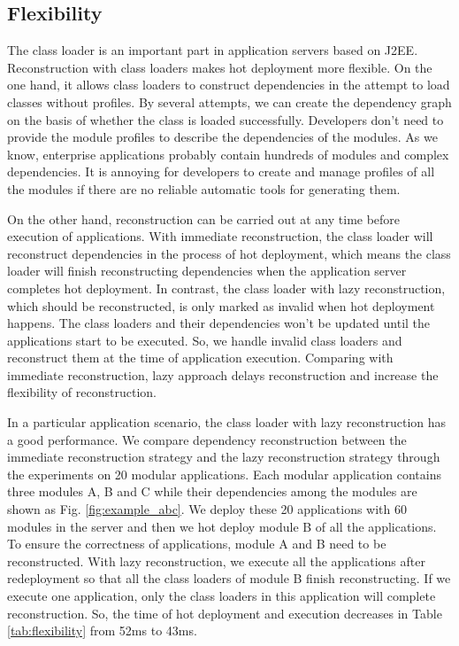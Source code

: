 \documentclass[conference]{IEEEtran}
\begin{document}
\subsection{Flexibility}

The class loader is an important part in application servers based on J2EE.
Reconstruction with class loaders makes hot deployment more flexible.
On the one hand, it allows class loaders to construct dependencies in the attempt to load classes without profiles.
By several attempts, we can create the dependency graph on the basis of whether the class is loaded successfully.
Developers don't need to provide the module profiles to describe the dependencies of the modules.
As we know, enterprise applications probably contain hundreds of modules and complex dependencies.
It is annoying for developers to create and manage profiles of all the modules if there are no reliable automatic tools for generating them.

On the other hand, reconstruction can be carried out at any time before execution of applications.
With immediate reconstruction, the class loader will reconstruct dependencies in the process of hot deployment, which means the class loader will finish reconstructing dependencies when the application server completes hot deployment.
In contrast, the class loader with lazy reconstruction, which should be reconstructed, is only marked as invalid when hot deployment happens.
The class loaders and their dependencies won't be updated until the applications start to be executed.
So, we handle invalid class loaders and reconstruct them at the time of application execution.
Comparing with immediate reconstruction, lazy approach delays reconstruction and increase the flexibility of reconstruction.

In a particular application scenario, the class loader with lazy reconstruction has a good performance. 
We compare dependency reconstruction between the immediate reconstruction strategy and the lazy reconstruction strategy through the experiments on 20 modular applications.
Each modular application contains three modules A, B and C while their dependencies among the modules are shown as Fig. \ref{fig:example_abc}.
We deploy these 20 applications with 60 modules in the server and then we hot deploy module B of all the applications.
To ensure the correctness of applications, module A and B need to be reconstructed.
With lazy reconstruction, we execute all the applications after redeployment so that all the class loaders of module B finish reconstructing.
If we execute one application, only the class loaders in this application will complete reconstruction.
So, the time of hot deployment and execution decreases in Table \ref{tab:flexibility} from 52ms to 43ms. 
\end{document}
